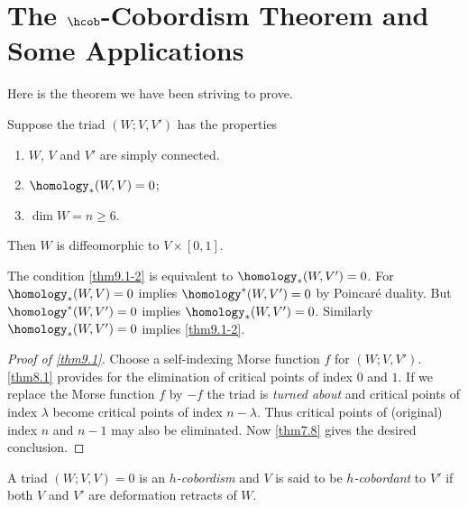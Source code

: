 
\newpage
\section{The $\protect \hcob$-Cobordism Theorem and Some Applications}\label{sec9}

Here is the theorem we have been striving to prove.
\begin{theorem}\label{thm9.1}
	Suppose the triad $(W; V, V')$ has the properties
	\begin{enumerate}[label={\upshape{(\arabic*)}},leftmargin=1.5cm]
		\item\label{thm9.1-1}  $W$, $V$ and $V'$ are simply connected.
		\item\label{thm9.1-2}  $\homology_*(W, V) = 0$;
		\item\label{thm9.1-3}  $\dim W = n \geq 6$.
	\end{enumerate}
	Then $W$ is diffeomorphic to $V\times [0, 1]$.
\end{theorem}

\begin{remark*}
	The condition \ref{thm9.1-2} is equivalent to $\homology_*(W, V') =0$.
	For $\homology_*(W, V) = 0$ implies $\homology^*(W, V') = 0$ by Poincar\'{e} duality.
	But $\homology^*(W, V') = 0$ implies $\homology_*(W, V') = 0$. Similarly $\homology_*(W, V') =0$
	implies \ref{thm9.1-2}.
\end{remark*}
\begin{proof}[Proof of \cref{thm9.1}]
	Choose a self-indexing Morse function $f$ for $(W; V, V')$.
	\cref{thm8.1} provides for the elimination of critical points of
	index $0$ and $1$. If we replace the Morse function $f$ by $-f$
	the triad is \emph{turned about} and critical points of index $\lambda$
	become critical points of index $n - \lambda$. Thus critical points
	of (original) index $n$ and $n - 1$ may also be eliminated. Now
	\cref{thm7.8} gives the desired conclusion.
\end{proof}


\begin{definition}\label{def9.2}
	A triad $(W; V, V ) = 0$ is an \emph{$h$-cobordism} and
	$V$ is said to be \emph{$h$-cobordant} to $V'$ if both $V$ and $V'$ are deformation retracts of $W$.
\end{definition}

